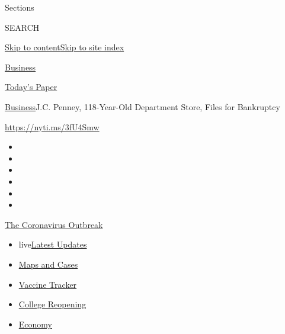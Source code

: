 Sections

SEARCH

\protect\hyperlink{site-content}{Skip to
content}\protect\hyperlink{site-index}{Skip to site index}

\href{https://www.nytimes3xbfgragh.onion/section/business}{Business}

\href{https://myaccount.nytimes3xbfgragh.onion/auth/login?response_type=cookie\&client_id=vi}{}

\href{https://www.nytimes3xbfgragh.onion/section/todayspaper}{Today's
Paper}

\href{/section/business}{Business}\textbar{}J.C. Penney, 118-Year-Old
Department Store, Files for Bankruptcy

\href{https://nyti.ms/3fU4Smw}{https://nyti.ms/3fU4Smw}

\begin{itemize}
\item
\item
\item
\item
\item
\item
\end{itemize}

\href{https://www.nytimes3xbfgragh.onion/news-event/coronavirus?action=click\&pgtype=Article\&state=default\&region=TOP_BANNER\&context=storylines_menu}{The
Coronavirus Outbreak}

\begin{itemize}
\tightlist
\item
  live\href{https://www.nytimes3xbfgragh.onion/2020/08/03/world/coronavirus-covid-19.html?action=click\&pgtype=Article\&state=default\&region=TOP_BANNER\&context=storylines_menu}{Latest
  Updates}
\item
  \href{https://www.nytimes3xbfgragh.onion/interactive/2020/us/coronavirus-us-cases.html?action=click\&pgtype=Article\&state=default\&region=TOP_BANNER\&context=storylines_menu}{Maps
  and Cases}
\item
  \href{https://www.nytimes3xbfgragh.onion/interactive/2020/science/coronavirus-vaccine-tracker.html?action=click\&pgtype=Article\&state=default\&region=TOP_BANNER\&context=storylines_menu}{Vaccine
  Tracker}
\item
  \href{https://www.nytimes3xbfgragh.onion/2020/08/02/us/covid-college-reopening.html?action=click\&pgtype=Article\&state=default\&region=TOP_BANNER\&context=storylines_menu}{College
  Reopening}
\item
  \href{https://www.nytimes3xbfgragh.onion/live/2020/08/03/business/stock-market-today-coronavirus?action=click\&pgtype=Article\&state=default\&region=TOP_BANNER\&context=storylines_menu}{Economy}
\end{itemize}

